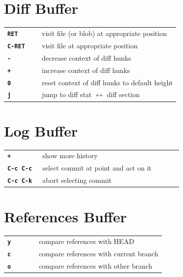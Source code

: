 \documentclass[9pt]{extarticle} %
\begin{document}
\begin{multicols}{3}
  \columnbreak{}

  \section*{Diff Buffer}

  \begin{tabular}{L{0.20\linewidth} L{0.80\linewidth}}
    \tt \textbf{RET} & visit file (or blob) at appropriate position \\
    \tt \textbf{C-RET} & visit file at appropriate position \\
    \tt \textbf{-} & decrease context of diff hunks \\
    \tt \textbf{+} & increase context of diff hunks \\
    \tt \textbf{0} & reset context of diff hunks to default height \\
    \tt \textbf{j} & jump to diff stat $\leftrightarrow$ diff section
  \end{tabular}


  \section*{Log Buffer}

  \begin{tabular}{L{0.20\linewidth} L{0.80\linewidth}}
    \tt \textbf{+} & show more history \\
    \tt \textbf{C-c C-c} & select commit at point and act on it \\
    \tt \textbf{C-c C-k} & abort selecting commit
  \end{tabular}


  \section*{References Buffer}

  \begin{tabular}{L{0.20\linewidth} L{0.80\linewidth}}
    \tt \textbf{y} & compare references with HEAD \\
    \tt \textbf{c} & compare references with current branch \\
    \tt \textbf{o} & compare references with other branch
  \end{tabular}


\end{multicols}
\end{document}
